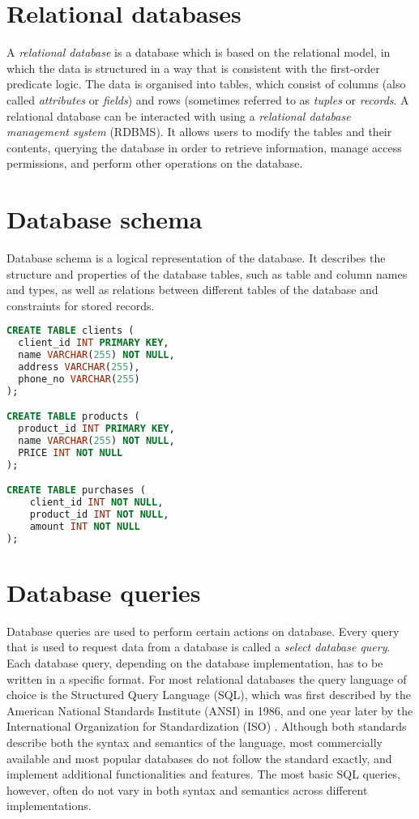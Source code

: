 \documentclass[magisterska,en]{pracamgr}
\begin{document}
\section{Relational databases}

A \emph{relational database} is a database which is based on the relational model, in which the data is structured in a way that is consistent with the first-order predicate logic. The data is organised into tables, which consist of columns (also called \emph{attributes} or \emph{fields}) and rows (sometimes referred to as \emph{tuples} or \emph{records}. A relational database can be interacted with using a \emph{relational database management system} (RDBMS). It allows users to modify the tables and their contents, querying the database in order to retrieve information, manage access permissions, and perform other operations on the database.

\section{Database schema}

Database schema is a logical representation of the database. It describes the structure and properties of the database tables, such as table and column names and types, as well as relations between different tables of the database and constraints for stored records.

\begin{lstlisting}[language=SQL, caption=Example database schema definition]
CREATE TABLE clients (
  client_id INT PRIMARY KEY,
  name VARCHAR(255) NOT NULL,
  address VARCHAR(255),
  phone_no VARCHAR(255)
);

CREATE TABLE products (
  product_id INT PRIMARY KEY,
  name VARCHAR(255) NOT NULL,
  PRICE INT NOT NULL
);

CREATE TABLE purchases (
    client_id INT NOT NULL,
    product_id INT NOT NULL,
    amount INT NOT NULL
);
\end{lstlisting}

\section{Database queries}

Database queries are used to perform certain actions on database. Every query that is used to request data from a database is called a \emph{select database query}. Each database query, depending on the database implementation, has to be written in a specific format. For most relational databases the query language of choice is the Structured Query Language (SQL), which was first described by the American National Standards Institute (ANSI) in 1986, and one year later by the International Organization for Standardization (ISO) \cite{iso-sql-1998}. Although both standards describe both the syntax and semantics of the language, most commercially available and most popular databases do not follow the standard exactly, and implement additional functionalities and features. The most basic SQL queries, however, often do not vary in both syntax and semantics across different implementations.
\end{document}
